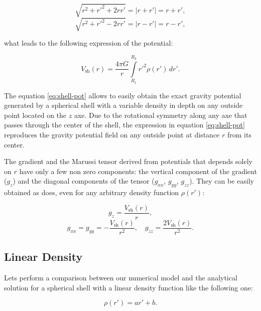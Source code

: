 \documentclass[extra]{gji}
\begin{document}
\begin{equation}
    \sqrt{r^2 + r'^2 + 2rr'} = |r + r'| = r + r',
\end{equation}
\begin{equation}
    \sqrt{r^2 + r'^2 - 2rr'} = |r - r'| = r - r',
\end{equation}

\noindent what leads to the following expression of the potential:

\begin{equation}
    V_\text{sh}(r) = \frac{4\pi G}{r}
    \int\limits_{R_1}^{R_2} {r'}^2 \rho(r') \, dr'.
\label{eq:shell-pot}
\end{equation}

The equation \ref{eq:shell-pot} allows to easily obtain the exact
gravity potential generated by a spherical shell with a variable
density in depth on any outside point located on the $z$ axe.
Due to the rotational symmetry along any axe that passes through the
center of the shell, the expression in equation \ref{eq:shell-pot}
reproduces the gravity potential field on any outside point at distance
$r$ from its center.

The gradient and the Marussi tensor derived from potentials that
depends solely on $r$ have only a few non zero components: the vertical
component of the gradient ($g_z$) and the diagonal components of the
tensor ($g_{xx}$, $g_{yy}$, $g_{zz}$).
They can be easily obtained as \citet{Grombein2013} does, even for any
arbitrary density function $\rho(r')$:

\begin{equation}
    g_z = \frac{V_\text{sh}(r)}{r},
\end{equation}
\begin{equation}
    g_{xx} = g_{yy} = -\frac{V_\text{sh}(r)}{r^2}, \quad
    g_{zz} = \frac{2V_\text{sh}(r)}{r^2}.
\end{equation}


\subsection{Linear Density}

Lets perform a comparison between our numerical model and the
analytical solution for a spherical shell with a linear density
function like the following one:

\begin{equation}
    \rho(r') = ar' + b.
\end{equation}
\end{document}
